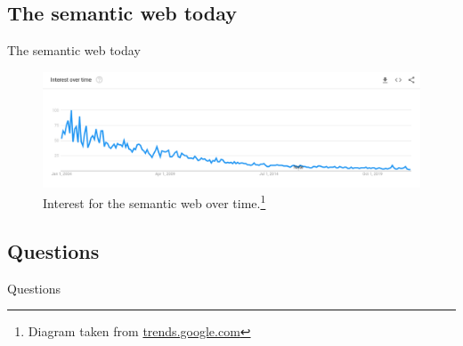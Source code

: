 \documentclass{beamer}
\begin{document}
	\subsection{The semantic web today}
	\begin{frame}{The semantic web today}
		\begin{figure}
			\includegraphics[scale=0.25]{resources/semantic-web-is-dead.png}
			\caption{Interest for the semantic web over time.\footnote[frame]{%
				Diagram taken from \url{trends.google.com} }}
		\end{figure}
	\end{frame}

	\subsection{Questions}
	\begin{frame}[label=questions]{Questions}
	\end{frame}
\end{document}
